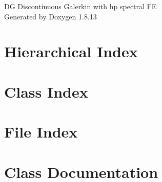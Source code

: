 \documentclass[twoside]{book}
\newcommand{\+}{\discretionary{\mbox{\scriptsize$\hookleftarrow$}}{}{}}
\newcommand{\clearemptydoublepage}{%
  \newpage{\pagestyle{empty}\cleardoublepage}%
}
\begin{document}
\hypersetup{pageanchor=false,
             bookmarksnumbered=true,
             pdfencoding=unicode
            }
\begin{titlepage}
\vspace*{7cm}
\begin{center}%
{\Large DG Discontinuous Galerkin with hp spectral FE }\\
\vspace*{1cm}
{\large Generated by Doxygen 1.8.13}\\
\end{center}
\end{titlepage}
\clearemptydoublepage
{}
\tableofcontents
\clearemptydoublepage
{}
\hypersetup{pageanchor=true}

\chapter{Hierarchical Index}

\chapter{Class Index}

\chapter{File Index}

\chapter{Class Documentation}


























\end{document}

